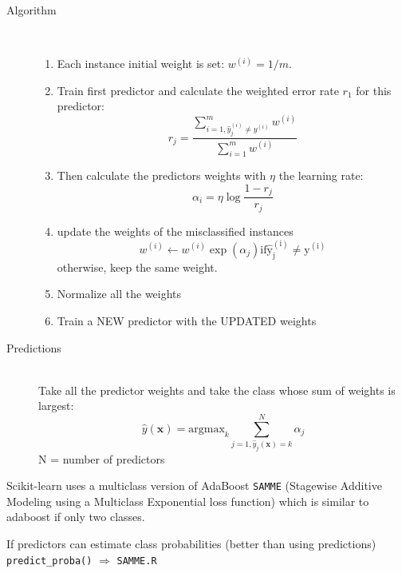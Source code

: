 \begin{description}
    \item[Algorithm] \hfill\\
        \begin{enumerate}
            \item Each instance initial weight is set: $w^{(i)}= 1/m$.
            \item Train first predictor and calculate the weighted error rate $r_1$ for this predictor:
                \begin{equation}
                    r_j = \frac{ \sum_{ i=1, \hat{y}_j^{(i)}\neq y^{(i)} }^m w^{(i)}}{ \sum_{i=1}^m  w^{(i)}}
                \end{equation}
            \item Then calculate the predictors weights with $\eta$ the learning rate:
                \begin{equation}
                    \alpha_i = \eta\log\frac{1-r_j}{r_j}
                \end{equation}
            \item update the weights of the misclassified instances
                \begin{equation}
                    w^{(i)} \leftarrow w^{(i)}\exp(\alpha_j)    \mathrm{if \hat{y}_j^{(i)}\neq y^{(i)}}
                \end{equation}
                otherwise, keep the same weight.
            \item Normalize all the weights
            \item Train a NEW predictor with the UPDATED weights
        \end{enumerate}
    \item[Predictions] \hfill\\
    Take all the predictor weights and take the class whose sum of weights is largest:
    \begin{equation}
        \hat{y}\left(\mathbf{x}\right) = \mathrm{argmax}_k \sum_{j=1, \hat{y}_j\left(\mathbf{x}\right)=k}^N \alpha_j
    \end{equation}
    N = number of predictors
\end{description}

Scikit-learn uses a multiclass version of AdaBoost \verb;SAMME; (Stagewise Additive Modeling using a Multiclass Exponential loss function) which is similar to adaboost if only two classes.

If predictors can estimate class probabilities (better than using predictions)
\verb;predict_proba(); $\Rightarrow$ \verb;SAMME.R;

